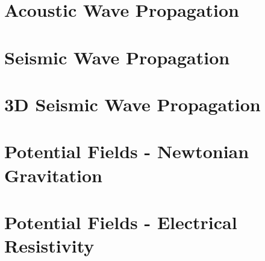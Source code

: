 \documentclass{esysdoc}
\begin{document}
\chapter{Acoustic Wave Propagation}
% 
\chapter{Seismic Wave Propagation}
 

\chapter{3D Seismic Wave Propagation}
 
 
\chapter{Potential Fields - Newtonian Gravitation}
 
 
\chapter{Potential Fields - Electrical Resistivity}
 





\appendix
%
\printindex
\end{document}
